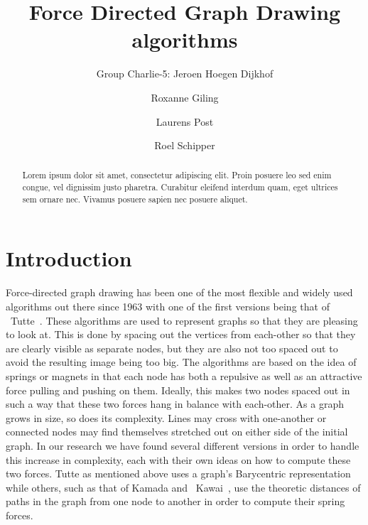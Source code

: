\documentclass[a4paper,12pt,twoside]{article}
\begin{document}
\title{Force Directed Graph Drawing algorithms}
\author{Group Charlie-5: Jeroen Hoegen Dijkhof \and Roxanne Giling \and Laurens Post \and Roel Schipper}
\maketitle
\begin{abstract}
Lorem ipsum dolor sit amet, consectetur adipiscing elit. Proin posuere leo sed enim congue, vel dignissim justo pharetra. Curabitur eleifend interdum quam, eget ultrices sem ornare nec. Vivamus posuere sapien nec posuere aliquet.
\end{abstract}
\newpage

\tableofcontents
\newpage

\section{Introduction}\label{s:Introduction}
Force-directed graph drawing has been one of the most flexible and widely used algorithms out there since 1963 with one of the first versions being that of ~Tutte~\cite{Tutte}. These algorithms are used to represent graphs so that they are pleasing to look at. This is done by spacing out the vertices from each-other so that they are clearly visible as separate nodes, but they are also not too spaced out to avoid the resulting image being too big. The algorithms are based on the idea of springs or magnets in that each node has both a repulsive as well as an attractive force pulling and pushing on them. Ideally, this makes two nodes spaced out in such a way that these two forces hang in balance with each-other. As a graph grows in size, so does its complexity. Lines may cross with one-another or connected nodes may find themselves stretched out on either side of the initial graph. In our research we have found several different versions in order to handle this increase in complexity, each with their own ideas on how to compute these two forces. Tutte as mentioned above uses a graph's Barycentric representation while others, such as that of Kamada and ~Kawai~\cite{Kawai}, use the theoretic distances of paths in the graph from one node to another in order to compute their spring forces.
\end{document}
